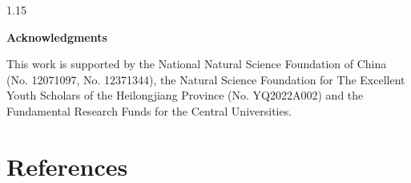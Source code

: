 \documentclass[preprint,12pt]{elsarticle1}
\numberwithin{equation}{section}
\begin{document}
\begin{spacing}{1.15}
\vspace{3mm}

\noindent
\textbf{Acknowledgments}
\vspace{3mm}
\noindent

This work is supported by the National Natural Science Foundation of China (No. 12071097, No. 12371344), the Natural Science Foundation for The Excellent Youth Scholars of the Heilongjiang Province (No. YQ2022A002) and the Fundamental Research Funds for the
Central Universities.







\section*{References}


\end{spacing}
\end{document}
